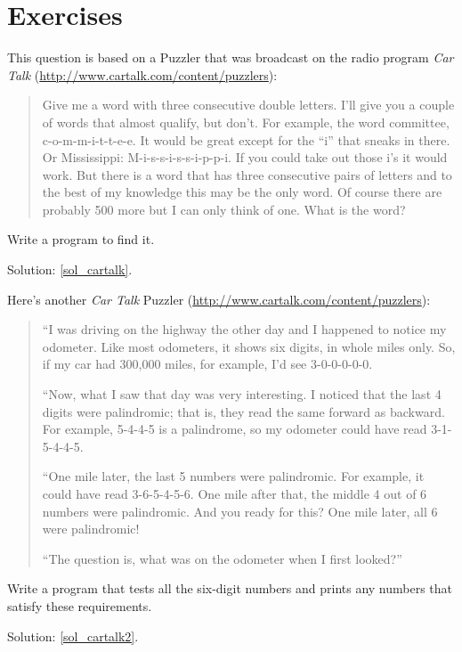 \section{Exercises}

\begin{exercise}
\label{cartalk}

This question is based on a Puzzler that was broadcast on the radio
program {\em Car Talk} 
(\url{http://www.cartalk.com/content/puzzlers}):

\begin{quote}
Give me a word with three consecutive double letters. I'll give you a
couple of words that almost qualify, but don't. For example, the word
committee, c-o-m-m-i-t-t-e-e. It would be great except for the ``i'' that
sneaks in there. Or Mississippi: M-i-s-s-i-s-s-i-p-p-i. If you could
take out those i's it would work. But there is a word that has three
consecutive pairs of letters and to the best of my knowledge this may
be the only word. Of course there are probably 500 more but I can only
think of one. What is the word?
\end{quote}

Write a program to find it.

Solution: \ref{sol_cartalk}.

\end{exercise}


\begin{exercise}
Here's another {\em Car Talk}
Puzzler (\url{http://www.cartalk.com/content/puzzlers}):
\label{cartalk2}

\begin{quote}
``I was driving on the highway the other day and I happened to
notice my odometer. Like most odometers, it shows six digits,
in whole miles only. So, if my car had 300,000
miles, for example, I'd see 3-0-0-0-0-0.

``Now, what I saw that day was very interesting. I noticed that the
last 4 digits were palindromic; that is, they read the same forward as
backward. For example, 5-4-4-5 is a palindrome, so my odometer
could have read 3-1-5-4-4-5.

``One mile later, the last 5 numbers were palindromic. For example, it
could have read 3-6-5-4-5-6.  One mile after that, the middle 4 out of
6 numbers were palindromic.  And you ready for this? One mile later,
all 6 were palindromic!

``The question is, what was on the odometer when I first looked?''
\end{quote}

Write a program that tests all the six-digit numbers and prints
any numbers that satisfy these requirements.
  
Solution: \ref{sol_cartalk2}.

\end{exercise}


